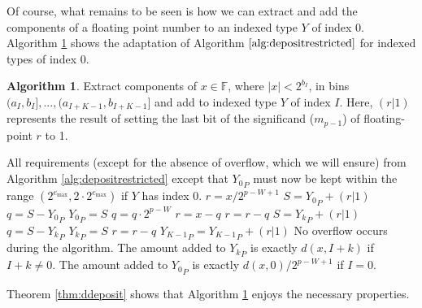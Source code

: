 \documentclass[12pt]{article}
\providecommand{\F}{\ensuremath{\mathbb{F}}}
\providecommand{\max}{\ensuremath{\text{max}}}
\providecommand{\To}{\ensuremath{\text{ to }}}
\theoremstyle{definition}
\newtheorem{alg}{Algorithm}[section]
\numberwithin{equation}{section}
\numberwithin{figure}{section}
\begin{document}
      Of course, what remains to be seen is how we can extract and add the components of a floating point number to an indexed type $Y$ of index 0. Algorithm \ref{alg:deposit} shows the adaptation of Algorithm $\ref{alg:depositrestricted}$ for indexed types of index 0.

      \begin{samepage}
      \begin{alg}
        Extract components of $x \in \F$, where $|x| < 2^{b_I}$, in bins $(a_I, b_I], ..., (a_{I + K - 1}, b_{I + K - 1}]$ and add to indexed type $Y$ of index $I$. Here, $(r | 1)$ represents the result of setting the last bit of the significand ($m_{p - 1}$) of floating-point $r$ to 1.
        \begin{algorithmic}[1]
          \Require
            \Statex All requirements (except for the absence of overflow, which we will ensure) from Algorithm \ref{alg:depositrestricted} except that ${Y_0}_P$ must now be kept within the range $(2^{e_{\max}}, 2 \cdot 2^{e_{\max}})$ if $Y$ has index 0.
            \State {}
              \State $r = x / 2^{p - W + 1}$ \label{alg:deposit:scaler}
              \State $S = {Y_0}_P + (r | 1)$ \label{alg:deposit:formS}
              \State $q = S - {Y_0}_P$ \label{alg:deposit:formq}
              \State ${Y_0}_P = S$
              \State $q = q \cdot 2^{p - W}$ \label{alg:deposit:scaleq}
              \State $r = x - q$ \label{alg:deposit:formr}
              \State $r = r - q$ \label{alg:deposit:formragain}
              \For{$k = 1 \To (K - 2)$}
                \State $S = {Y_k}_P + (r | 1)$
                \State $q = S - {Y_k}_P$
                \State ${Y_k}_P = S$
                \State $r = r - q$
              \EndFor
              \State ${Y_{K - 1}}_P = {Y_{K - 1}}_P + (r | 1)$
            \Else
              \State{} \label{alg:deposit:callrestricted}
            \EndIf
          \EndFunction
          \Ensure
            \Statex No overflow occurs during the algorithm.
            \Statex The amount added to ${Y_k}_P$ is exactly $d(x, I + k)$ if $I + k \neq 0$.
            \Statex The amount added to ${Y_0}_P$ is exactly $d(x, 0)/2^{p - W + 1}$ if $I = 0$.
        \end{algorithmic}
        \label{alg:deposit}
      \end{alg}
      \end{samepage}

      Theorem \ref{thm:ddeposit} shows that Algorithm \ref{alg:deposit} enjoys the necessary properties.
\end{document}
